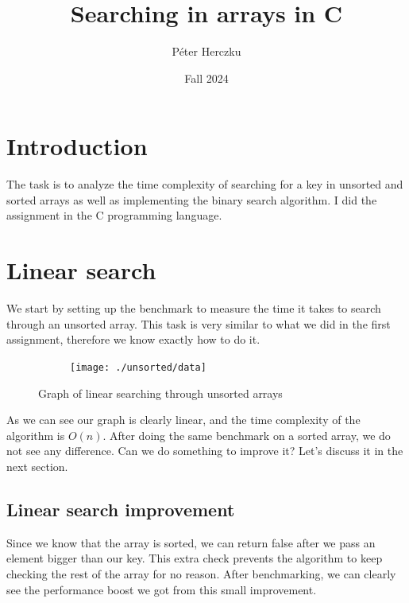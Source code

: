 \documentclass[a4paper,11pt]{article}
\begin{document}
    \title{
        \textbf{Searching in arrays in C}
    }
    \author{Péter Herczku}
    \date{Fall 2024}

    \maketitle

    \section*{Introduction}

    The task is to analyze the time complexity of searching for a key in unsorted and sorted arrays as well as implementing the binary search algorithm.
    I did the assignment in the C programming language.

    \section*{Linear search}

    We start by setting up the benchmark to measure the time it takes to search through an unsorted array.
    This task is very similar to what we did in the first assignment, therefore we know exactly how to do it.

    \begin{figure}[h]
        \centering
        \begin{subfigure}[b]{.5\textwidth}
            \centering
            \texttt{[image: ./unsorted/data]} %
        \end{subfigure}
        \caption{Graph of linear searching through unsorted arrays}
        \label{fig:graph_1}
    \end{figure}

    As we can see our graph is clearly linear, and the time complexity of the algorithm is $O(n)$.
    After doing the same benchmark on a sorted array, we do not see any difference.
    Can we do something to improve it?
    Let's discuss it in the next section.

    \subsection*{Linear search improvement}

    Since we know that the array is sorted, we can return false after we pass an element bigger than our key.
    This extra check prevents the algorithm to keep checking the rest of the array for no reason.
    After benchmarking, we can clearly see the performance boost we got from this small improvement.
\end{document}
